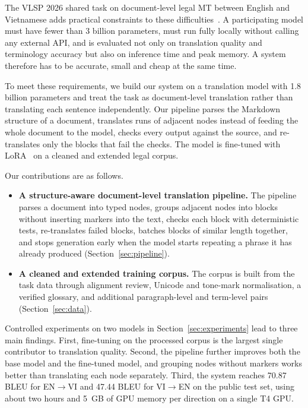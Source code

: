 \documentclass[conference]{IEEEtran}
\newcommand{\envi}{EN$\rightarrow$VI}
\newcommand{\vien}{VI$\rightarrow$EN}
\begin{document}
The VLSP 2026 shared task on document-level legal MT between English and Vietnamese adds practical constraints to these difficulties~\cite{vlsp2026}. A participating model must have fewer than 3 billion parameters, must run fully locally without calling any external API, and is evaluated not only on translation quality and terminology accuracy but also on inference time and peak memory. A system therefore has to be accurate, small and cheap at the same time.

To meet these requirements, we build our system on a translation model with 1.8 billion parameters and treat the task as document-level translation rather than translating each sentence independently. Our pipeline parses the Markdown structure of a document, translates runs of adjacent nodes instead of feeding the whole document to the model, checks every output against the source, and re-translates only the blocks that fail the checks. The model is fine-tuned with LoRA~\cite{hu2022lora} on a cleaned and extended legal corpus.

Our contributions are as follows.
\begin{itemize}
\item \textbf{A structure-aware document-level translation pipeline.} The pipeline parses a document into typed nodes, groups adjacent nodes into blocks without inserting markers into the text, checks each block with deterministic tests, re-translates failed blocks, batches blocks of similar length together, and stops generation early when the model starts repeating a phrase it has already produced (Section~\ref{sec:pipeline}).
\item \textbf{A cleaned and extended training corpus.} The corpus is built from the task data through alignment review, Unicode and tone-mark normalisation, a verified glossary, and additional paragraph-level and term-level pairs (Section~\ref{sec:data}).
\end{itemize}

Controlled experiments on two models in Section~\ref{sec:experiments} lead to three main findings. First, fine-tuning on the processed corpus is the largest single contributor to translation quality. Second, the pipeline further improves both the base model and the fine-tuned model, and grouping nodes without markers works better than translating each node separately. Third, the system reaches 70.87 BLEU for \envi{} and 47.44 BLEU for \vien{} on the public test set, using about two hours and 5~GB of GPU memory per direction on a single T4 GPU.
\end{document}
